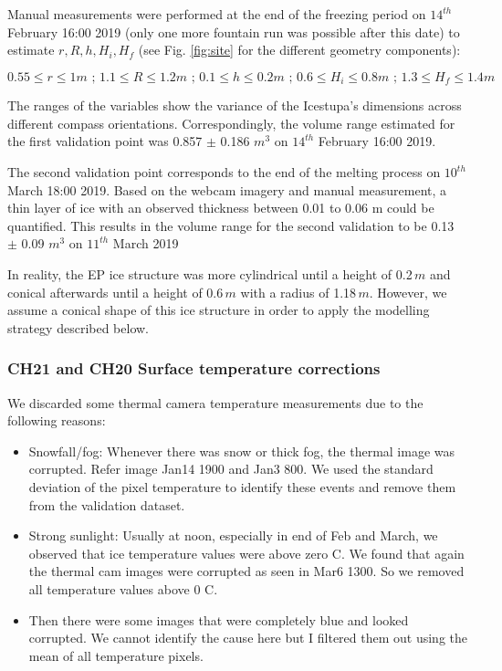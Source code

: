 \documentclass[utf8]{frontiersSCNS} %
\begin{document}
Manual measurements were performed at the end of the freezing period on $14^{th}$ February 16:00 2019 (only one more
fountain run was possible after this date) to estimate $r, R, h, H_i, H_f$ (see Fig. \ref{fig:site} for the different
geometry components):

$$ 0.55\leq r\leq 1 m\textit{ ; }1.1\leq R\leq 1.2 m\textit{ ; }0.1\leq h\leq 0.2 m\textit{ ; }0.6\leq
H_i\leq 0.8 m\textit{ ; }1.3\leq H_f\leq 1.4 m  $$

The ranges of the variables show the variance of the Icestupa's dimensions across different compass orientations.
Correspondingly, the volume range estimated for the first validation point was 0.857 $\pm$ 0.186 $m^{3}$ on $14^{th}$
February 16:00 2019.

The second validation point corresponds to the end of the melting process on $10^{th}$ March 18:00 2019.  Based on the
webcam imagery and manual measurement, a thin layer of ice with an observed thickness between 0.01 to 0.06 m could be
quantified. This results in the volume range for the second validation to be 0.13 $\pm$ 0.09 $m^{3}$ on $11^{th}$ March
2019 

In reality, the EP ice structure was more cylindrical until a height of 0.2\,$m$ and conical afterwards until a
height of 0.6\,$m$ with a radius of 1.18\,$m$. However, we assume a conical shape of this ice structure in order to
apply the modelling strategy described below.

\subsubsection{CH21 and CH20 Surface temperature corrections} \label{section:thermalcam} 
We discarded some thermal camera temperature measurements due to the following reasons:
\begin{itemize} 
    \item Snowfall/fog: Whenever there was snow or thick fog, the thermal image was corrupted. Refer image Jan14 1900 and
Jan3 800. We used the standard deviation of the pixel temperature to identify these events and remove them from the
validation dataset. 

\item Strong sunlight: Usually at noon, especially in end of Feb and March, we observed that ice temperature values were
    above zero C. We found that again the thermal cam images were corrupted as seen in Mar6 1300. So we removed all
    temperature values above 0 C.  

\item Then there were some images that were completely blue and looked corrupted.  We cannot identify the cause here but
    I filtered them out using the mean of all temperature pixels.

\end{itemize} 
\end{document}
